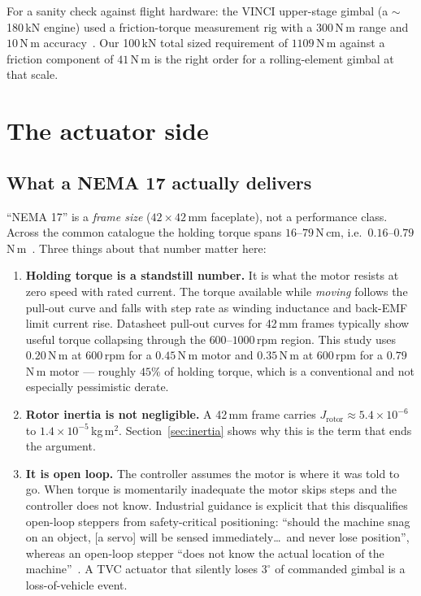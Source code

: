 \documentclass[11pt]{article}
\begin{document}
For a sanity check against flight hardware: the VINCI upper-stage gimbal
(a $\sim$180\,kN engine) used a friction-torque measurement rig with a
$300$\,N\,m range and $10$\,N\,m accuracy~\cite{neugebauer2006}. Our
100\,kN total sized requirement of $1109$\,N\,m against a friction
component of $41$\,N\,m is the right order for a rolling-element gimbal
at that scale.

\section{The actuator side}

\subsection{What a NEMA 17 actually delivers}

``NEMA 17'' is a \emph{frame size} ($42\times42$\,mm faceplate), not a
performance class. Across the common catalogue the holding torque spans
$16$--$79$\,N\,cm, i.e.\ $0.16$--$0.79$\,N\,m~\cite{stepperonline}. Three
things about that number matter here:

\begin{enumerate}[leftmargin=1.4em,itemsep=3pt]
\item \textbf{Holding torque is a standstill number.} It is what the motor
resists at zero speed with rated current. The torque available while
\emph{moving} follows the pull-out curve and falls with step rate as winding
inductance and back-EMF limit current rise. Datasheet pull-out curves for
42\,mm frames typically show useful torque collapsing through the
$600$--$1000$\,rpm region. This study uses $0.20$\,N\,m at $600$\,rpm for a
$0.45$\,N\,m motor and $0.35$\,N\,m at $600$\,rpm for a $0.79$\,N\,m motor
--- roughly $45\%$ of holding torque, which is a conventional and not
especially pessimistic derate.

\item \textbf{Rotor inertia is not negligible.} A 42\,mm frame carries
$J_{\text{rotor}} \approx 5.4\times10^{-6}$ to $1.4\times10^{-5}$\,kg\,m$^2$.
Section~\ref{sec:inertia} shows why this is the term that ends the argument.

\item \textbf{It is open loop.} The controller assumes the motor is where it
was told to go. When torque is momentarily inadequate the motor skips steps
and the controller does not know. Industrial guidance is explicit that this
disqualifies open-loop steppers from safety-critical positioning:
``should the machine snag on an object, [a servo] will be sensed
immediately\ldots\ and never lose position'', whereas an open-loop stepper
``does not know the actual location of the machine''~\cite{orientalmotor}.
A TVC actuator that silently loses $3^\circ$ of commanded gimbal is a
loss-of-vehicle event.
\end{enumerate}
\end{document}
